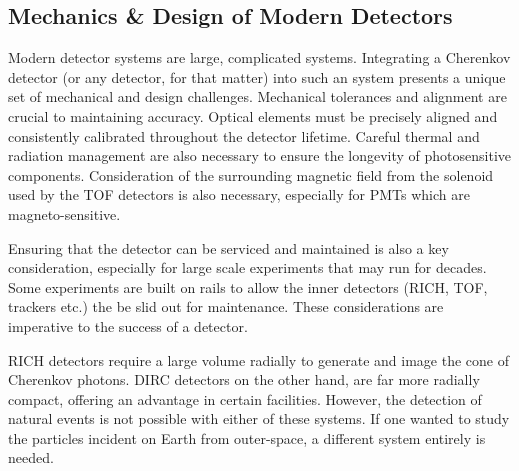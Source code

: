 \subsection{\label{sec:mechanics-and-integration}Mechanics \& Design of Modern Detectors}

Modern detector systems are large, complicated systems. Integrating a Cherenkov detector (or any detector, for that matter) into such an system presents a unique set of mechanical and design challenges. Mechanical tolerances and alignment are crucial to maintaining accuracy. Optical elements must be precisely aligned and consistently calibrated throughout the detector lifetime. Careful thermal and radiation management are also necessary to ensure the longevity of photosensitive components. Consideration of the surrounding magnetic field from the solenoid used by the TOF detectors is also necessary, especially for PMTs which are magneto-sensitive. 

Ensuring that the detector can be serviced and maintained is also a key consideration, especially for large scale experiments that may run for decades. Some experiments are built on rails to allow the inner detectors (RICH, TOF, trackers etc.) the be slid out for maintenance. These considerations are imperative to the success of a detector.

RICH detectors require a large volume radially to generate and image the cone of Cherenkov photons. DIRC detectors on the other hand, are far more radially compact, offering an advantage in certain facilities. However, the detection of natural events is not possible with either of these systems. If one wanted to study the particles incident on Earth from outer-space, a different system entirely is needed.